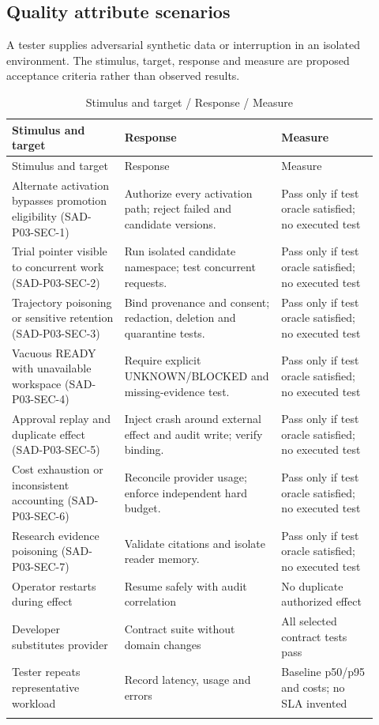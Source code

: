 \documentclass[10pt,letterpaper]{article}
\begin{document}
\subsection{Quality attribute scenarios}
A tester supplies adversarial synthetic data or interruption in an isolated environment. The stimulus, target, response and measure are proposed acceptance criteria rather than observed results.
\begin{longtable}{@{}>{\raggedright\arraybackslash}p{0.29\linewidth}>{\raggedright\arraybackslash}p{0.39\linewidth}>{\raggedright\arraybackslash}p{0.24\linewidth}@{}}
\caption{Stimulus and target / Response / Measure}\\
\toprule Stimulus and target & Response & Measure\\\midrule\endfirsthead
\toprule Stimulus and target & Response & Measure\\\midrule\endhead
Alternate activation bypasses promotion eligibility (SAD-P03-SEC-1) & Authorize every activation path; reject failed and candidate versions. & Pass only if test oracle satisfied; no executed test\\\addlinespace
Trial pointer visible to concurrent work (SAD-P03-SEC-2) & Run isolated candidate namespace; test concurrent requests. & Pass only if test oracle satisfied; no executed test\\\addlinespace
Trajectory poisoning or sensitive retention (SAD-P03-SEC-3) & Bind provenance and consent; redaction, deletion and quarantine tests. & Pass only if test oracle satisfied; no executed test\\\addlinespace
Vacuous READY with unavailable workspace (SAD-P03-SEC-4) & Require explicit UNKNOWN/BLOCKED and missing-evidence test. & Pass only if test oracle satisfied; no executed test\\\addlinespace
Approval replay and duplicate effect (SAD-P03-SEC-5) & Inject crash around external effect and audit write; verify binding. & Pass only if test oracle satisfied; no executed test\\\addlinespace
Cost exhaustion or inconsistent accounting (SAD-P03-SEC-6) & Reconcile provider usage; enforce independent hard budget. & Pass only if test oracle satisfied; no executed test\\\addlinespace
Research evidence poisoning (SAD-P03-SEC-7) & Validate citations and isolate reader memory. & Pass only if test oracle satisfied; no executed test\\\addlinespace
Operator restarts during effect & Resume safely with audit correlation & No duplicate authorized effect\\\addlinespace
Developer substitutes provider & Contract suite without domain changes & All selected contract tests pass\\\addlinespace
Tester repeats representative workload & Record latency, usage and errors & Baseline p50/p95 and costs; no SLA invented\\\addlinespace
\bottomrule\end{longtable}
\end{document}
